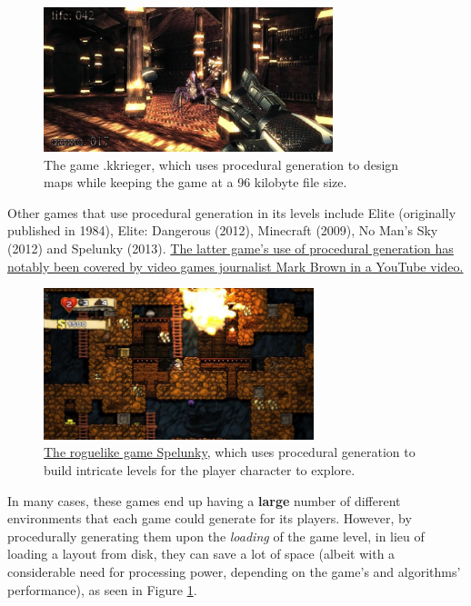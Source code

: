 \begin{figure}[H]
	\centering
	\includegraphics[width=0.75\textwidth]{Images/kkrieger.png}
	\caption{The game .kkrieger, which uses procedural generation to design maps while keeping the game at a 96 kilobyte file size.\cite{pcgvirtualworld}}
	\label{fig:kkrieger}
\end{figure}

Other games that use procedural generation in its levels include Elite (originally published in 1984), Elite: Dangerous (2012), Minecraft (2009), No Man's Sky (2012) and Spelunky (2013). \href{https://youtu.be/Uqk5Zf0tw3o}{The latter game's use of procedural generation has notably been covered by video games journalist Mark Brown in a YouTube video.}\cite{spelunkyvid}

\begin{figure}[H]
	\centering
	\includegraphics[width=0.7\textwidth]{Images/spelunky.jpg}
	\caption{\href{https://spelunkyworld.com/}{The roguelike game Spelunky}, which uses procedural generation to build intricate levels for the player character to explore.\cite{spelunkysteam}}
	\label{fig:spelunky}
\end{figure}

In many cases, these games end up having a \textbf{large} number of different environments that each game could generate for its players. However, by procedurally generating them upon the \textit{loading} of the game level, in lieu of loading a layout from disk, they can save a lot of space (albeit with a considerable need for processing power, depending on the game's and algorithms' performance), as seen in Figure \ref{fig:kkrieger}.

